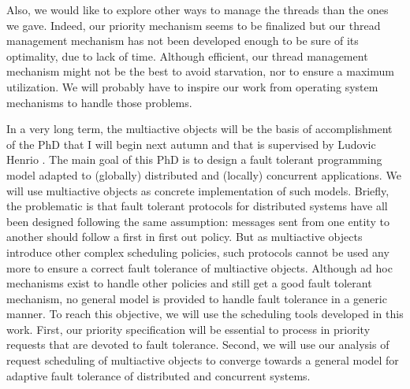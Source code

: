 \documentclass[11pt]{report}
\begin{document}
Also, we would like to explore other ways to manage the threads than the ones we gave. Indeed, our priority mechanism seems to be finalized but our thread management mechanism has not been developed enough to be sure of its optimality, due to lack of time. Although efficient, our thread management mechanism might not be the best to avoid starvation, nor to ensure a maximum utilization. We will probably have to inspire our work from operating system mechanisms to handle those problems.

In a very long term, the multiactive objects will be the basis of  accomplishment of the PhD that I will begin next autumn and that is supervised by Ludovic Henrio \cite{ref:these}. The main goal of this PhD is to design a fault tolerant programming model adapted to (globally) distributed and (locally) concurrent applications. We will use multiactive objects as concrete implementation of such models. Briefly, the problematic is that fault tolerant protocols for distributed systems have all been designed following the same assumption: messages sent from one entity to another should follow a first in first out policy. But as multiactive objects introduce other complex scheduling policies, such protocols cannot be used any more to ensure a correct fault tolerance of multiactive objects. Although ad hoc mechanisms exist to handle other policies and still get a good fault tolerant mechanism, no general model is provided to handle fault tolerance in a generic manner. To reach this objective, we will use the scheduling tools developed in this work. First, our priority specification will be essential to process in priority requests that are devoted to fault tolerance. Second, we will use our analysis of request scheduling of multiactive objects to converge towards a general model for adaptive fault tolerance of distributed and concurrent systems.




\end{document}
